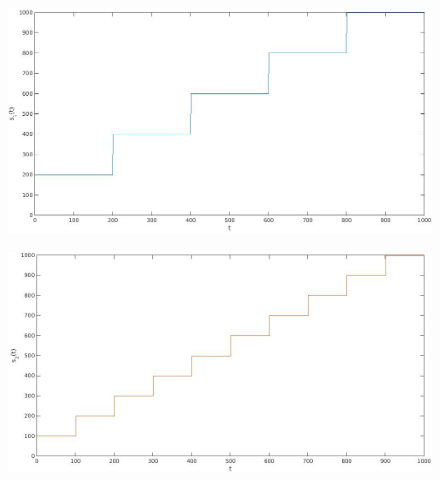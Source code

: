 \documentclass[10pt]{beamer}
\begin{document}
    \begin{frame} %
        \begin{figure}
            \centering
            \includegraphics[scale=0.23]{./figure/s1_sta_plot.png}
            \label{s1}
        \end{figure}%
        \begin{figure}
            \centering
            \includegraphics[scale=0.23]{./figure/s2_ap_plot.png}
            \label{s2}
        \end{figure}
    \end{frame}
\end{document}
